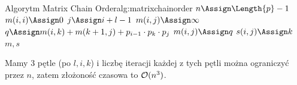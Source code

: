 \begin{alg}{Algorytm Matrix Chain Order}{alg:matrixchainorder}
	\State $n \Assign \Length{p} - 1$ 
	\State $m(i, i) \Assign 0$
	\EndFor
	 
	 
	\State $j \Assign i + l - 1$ 
	\State $m(i, j) \Assign \infty$ 
	\State $q \Assign m(i, k) + m(k + 1, j) + p_{i-1} \cdot p_k \cdot p_j$
	\State $m(i, j) \Assign q$
	\State $s(i, j) \Assign k$
	\EndIf
	\EndFor
	\EndFor
	\EndFor
	\State \Return $m, s$
	\EndFunction
\end{alg}

Mamy 3 pętle (po $l, i, k$) i liczbę iteracji każdej z tych pętli można ograniczyć przez $n$, zatem złożoność czasowa to $\mathcal{O}(n^3)$.

